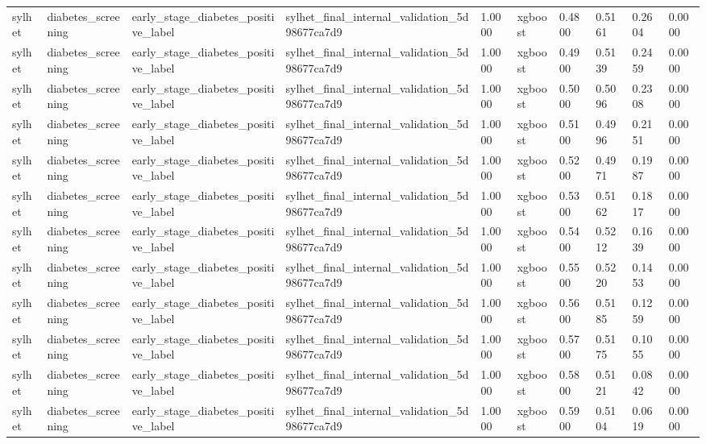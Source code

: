 \begin{tabular}{llllllllll}
sylhet & diabetes\_screening & early\_stage\_diabetes\_positive\_label & sylhet\_final\_internal\_validation\_5d98677ca7d9 & 1.0000 & xgboost & 0.4800 & 0.5161 & 0.2604 & 0.0000 \\
sylhet & diabetes\_screening & early\_stage\_diabetes\_positive\_label & sylhet\_final\_internal\_validation\_5d98677ca7d9 & 1.0000 & xgboost & 0.4900 & 0.5139 & 0.2459 & 0.0000 \\
sylhet & diabetes\_screening & early\_stage\_diabetes\_positive\_label & sylhet\_final\_internal\_validation\_5d98677ca7d9 & 1.0000 & xgboost & 0.5000 & 0.5096 & 0.2308 & 0.0000 \\
sylhet & diabetes\_screening & early\_stage\_diabetes\_positive\_label & sylhet\_final\_internal\_validation\_5d98677ca7d9 & 1.0000 & xgboost & 0.5100 & 0.4996 & 0.2151 & 0.0000 \\
sylhet & diabetes\_screening & early\_stage\_diabetes\_positive\_label & sylhet\_final\_internal\_validation\_5d98677ca7d9 & 1.0000 & xgboost & 0.5200 & 0.4971 & 0.1987 & 0.0000 \\
sylhet & diabetes\_screening & early\_stage\_diabetes\_positive\_label & sylhet\_final\_internal\_validation\_5d98677ca7d9 & 1.0000 & xgboost & 0.5300 & 0.5162 & 0.1817 & 0.0000 \\
sylhet & diabetes\_screening & early\_stage\_diabetes\_positive\_label & sylhet\_final\_internal\_validation\_5d98677ca7d9 & 1.0000 & xgboost & 0.5400 & 0.5212 & 0.1639 & 0.0000 \\
sylhet & diabetes\_screening & early\_stage\_diabetes\_positive\_label & sylhet\_final\_internal\_validation\_5d98677ca7d9 & 1.0000 & xgboost & 0.5500 & 0.5220 & 0.1453 & 0.0000 \\
sylhet & diabetes\_screening & early\_stage\_diabetes\_positive\_label & sylhet\_final\_internal\_validation\_5d98677ca7d9 & 1.0000 & xgboost & 0.5600 & 0.5185 & 0.1259 & 0.0000 \\
sylhet & diabetes\_screening & early\_stage\_diabetes\_positive\_label & sylhet\_final\_internal\_validation\_5d98677ca7d9 & 1.0000 & xgboost & 0.5700 & 0.5175 & 0.1055 & 0.0000 \\
sylhet & diabetes\_screening & early\_stage\_diabetes\_positive\_label & sylhet\_final\_internal\_validation\_5d98677ca7d9 & 1.0000 & xgboost & 0.5800 & 0.5121 & 0.0842 & 0.0000 \\
sylhet & diabetes\_screening & early\_stage\_diabetes\_positive\_label & sylhet\_final\_internal\_validation\_5d98677ca7d9 & 1.0000 & xgboost & 0.5900 & 0.5104 & 0.0619 & 0.0000 \\

\end{tabular}
